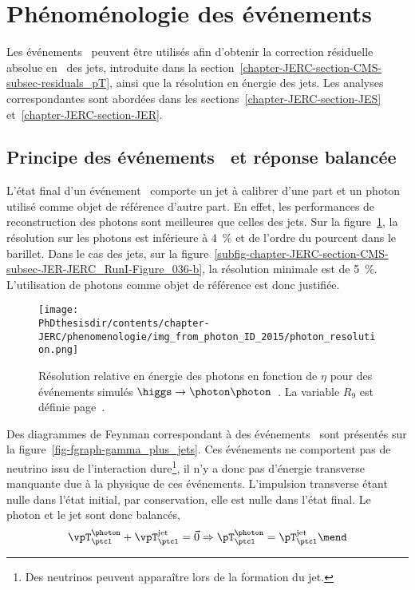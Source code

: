 \section{Phénoménologie des événements \Gjets}\label{chapter-JERC-section-pheno-GJets}
Les événements \Gjets\ peuvent être utilisés afin d'obtenir la correction résiduelle absolue en \pT\ des jets, introduite dans la section~\ref{chapter-JERC-section-CMS-subsec-residuals_pT}, ainsi que la résolution en énergie des jets. Les analyses correspondantes sont abordées dans les sections~\ref{chapter-JERC-section-JES} et~\ref{chapter-JERC-section-JER}.
\subsection{Principe des événements \Gjets\ et réponse balancée}
L'état final d'un événement \Gjets\ comporte un jet à calibrer d'une part et un photon utilisé comme objet de référence d'autre part.
En effet, les performances de reconstruction des photons sont meilleures que celles des jets. Sur la figure~\ref{fig-chapter-JERC-section-pheno-GJets-photon_resolution}, la résolution sur les photons est inférieure à \SI{4}{\%} et de l'ordre du pourcent dans le barillet. Dans le cas des jets, sur la figure~\ref{subfig-chapter-JERC-section-CMS-subsec-JER-JERC_RunI-Figure_036-b}, la résolution minimale est de \SI{5}{\%}.
L'utilisation de photons comme objet de référence est donc justifiée.
\begin{figure}[h]
\centering
\texttt{[image: \\PhDthesisdir/contents/chapter-JERC/phenomenologie/img\_from\_photon\_ID\_2015/photon\_resolution.png]}
\caption[Résolution en énergie des photons.]{Résolution relative en énergie des photons en fonction de $\eta$ pour des événements simulés $\higgs\to\photon\photon$~\cite{photon_ID_2015}. La variable $R_9$ est définie page~\pageref{eq-R9_definition}.}
\label{fig-chapter-JERC-section-pheno-GJets-photon_resolution}
\end{figure}
\par Des diagrammes de Feynman correspondant à des événements \Gjets\ sont présentés sur la figure~\ref{fig-fgraph-gamma_plus_jets}.
Ces événements ne comportent pas de neutrino issu de l'interaction dure\footnote{Des neutrinos peuvent apparaître lors de la formation du jet.}, il n'y a donc pas d'énergie transverse manquante due à la physique de ces événements.
L'impulsion transverse étant nulle dans l'état initial, par conservation, elle est nulle dans l'état final. Le photon et le jet sont donc balancés, \ie
\begin{equation}
\vpT_\ptcl^{\photon} + \vpT_\ptcl^\text{jet} = \vec{0}
\Rightarrow
\pT_\ptcl^{\photon} = \pT_\ptcl^\text{jet}
\mend
\end{equation}
